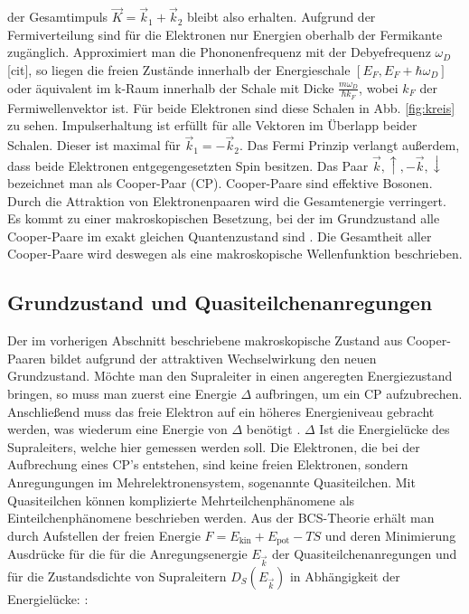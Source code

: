 \documentclass[twoside,        %
               BCOR12mm,       %
               english,ngerman, %
               fleqn,headsepline=false,footsepline=false
              ]{Vorlage/MFPREPORT}
\begin{document}
der Gesamtimpuls $\vec K=\vec k_1 + \vec k_2$ bleibt also erhalten.
Aufgrund der Fermiverteilung sind für die Elektronen nur Energien oberhalb der
Fermikante zugänglich. Approximiert man die Phononenfrequenz mit der
Debyefrequenz $\omega_D$ [cit], so liegen die freien Zustände innerhalb der
Energieschale $[E_F,E_F+\hbar \omega_D]$ oder äquivalent im k-Raum innerhalb
der Schale mit Dicke $\frac{m\omega_D}{\hbar k_F}$, wobei $k_F$ der
Fermiwellenvektor ist. Für beide Elektronen sind diese Schalen in Abb.
\ref{fig:kreis} zu sehen. Impulserhaltung ist erfüllt für alle Vektoren im
Überlapp beider Schalen. Dieser ist maximal für $\vec k_1 = -\vec k_2$. Das
Fermi Prinzip verlangt außerdem, dass beide Elektronen entgegengesetzten Spin
besitzen. Das Paar ${\vec k,\uparrow},{-\vec k,\downarrow}$ bezeichnet man als
Cooper-Paar (CP). Cooper-Paare sind effektive Bosonen. Durch die Attraktion von
Elektronenpaaren wird die Gesamtenergie verringert. Es kommt zu einer
makroskopischen Besetzung, bei der im Grundzustand alle Cooper-Paare im exakt gleichen
Quantenzustand sind \cite[Kap. 2.2]{buckel2013supraleitung}. Die Gesamtheit
aller Cooper-Paare wird deswegen als eine makroskopische Wellenfunktion
beschrieben.
\subsection{Grundzustand und Quasiteilchenanregungen}
Der im vorherigen Abschnitt beschriebene makroskopische Zustand aus
Cooper-Paaren bildet aufgrund der attraktiven Wechselwirkung den neuen
Grundzustand. Möchte man den Supraleiter in einen angeregten Energiezustand
bringen, so muss man zuerst eine Energie $\Delta$ aufbringen, um ein CP
aufzubrechen. Anschließend muss das freie Elektron auf ein höheres
Energieniveau gebracht werden, was wiederum eine Energie von $\Delta$ benötigt
\cite{tidecks1990current}. $\Delta$ Ist die Energielücke des Supraleiters,
welche hier gemessen werden soll. Die Elektronen, die bei der Aufbrechung eines CP's
entstehen, sind keine freien Elektronen, sondern Anregungungen im
Mehrelektronensystem, sogenannte Quasiteilchen. Mit Quasiteilchen können
komplizierte Mehrteilchenphänomene als Einteilchenphänomene beschrieben werden.
Aus der BCS-Theorie erhält man durch Aufstellen der freien Energie
$F=E_\text{kin}+E_\text{pot}-TS$ und deren Minimierung Ausdrücke für die
für die Anregungsenergie $E_{\vec{k}}$ der Quasiteilchenanregungen und für die
Zustandsdichte von Supraleitern $D_S(E_{\vec{k}})$ in Abhängigkeit der Energielücke: \cite[Kap.]{enss2011tieftemperaturphysik}:
\end{document}
